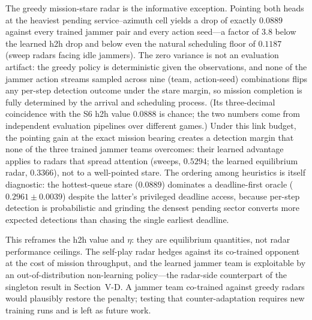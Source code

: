 The greedy mission-stare radar is the informative exception. Pointing both heads at the heaviest pending service--azimuth cell yields a drop of exactly $0.0889$ against every trained jammer pair and every action seed---a factor of 3.8 below the learned h2h drop and below even the natural scheduling floor of $0.1187$ (sweep radars facing idle jammers). The zero variance is not an evaluation artifact: the greedy policy is deterministic given the observations, and none of the jammer action streams sampled across nine (team, action-seed) combinations flips any per-step detection outcome under the stare margin, so mission completion is fully determined by the arrival and scheduling process. (Its three-decimal coincidence with the S6 h2h value 0.0888 is chance; the two numbers come from independent evaluation pipelines over different games.) Under this link budget, the pointing gain at the exact mission bearing creates a detection margin that none of the three trained jammer teams overcomes: their learned advantage applies to radars that spread attention (sweeps, $0.5294$; the learned equilibrium radar, $0.3366$), not to a well-pointed stare. The ordering among heuristics is itself diagnostic: the hottest-queue stare ($0.0889$) dominates a deadline-first oracle ($0.2961\pm0.0039$) despite the latter's privileged deadline access, because per-step detection is probabilistic and grinding the densest pending sector converts more expected detections than chasing the single earliest deadline.

This reframes the h2h value and $\eta$: they are equilibrium quantities, not radar performance ceilings. The self-play radar hedges against its co-trained opponent at the cost of mission throughput, and the learned jammer team is exploitable by an out-of-distribution non-learning policy---the radar-side counterpart of the singleton result in Section~V-D. A jammer team co-trained against greedy radars would plausibly restore the penalty; testing that counter-adaptation requires new training runs and is left as future work.

